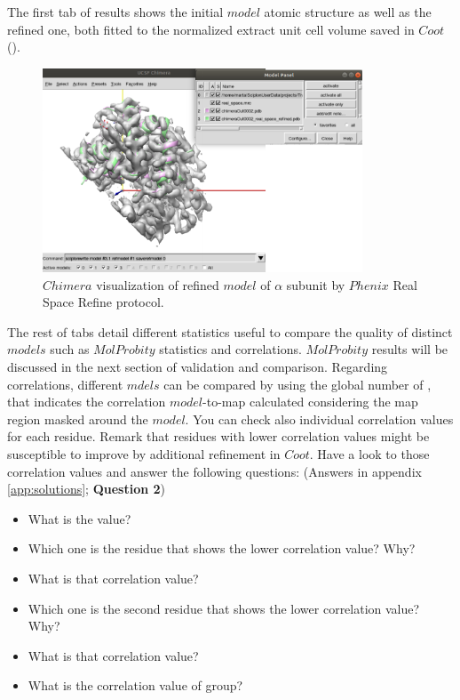 \begin{itemize}
 The first tab of results shows the initial $model$ atomic structure as well as the refined one, both fitted to the normalized extract unit cell volume saved in $Coot$ (). 
 
 \begin{figure}[H]
  \centering 
  \captionsetup{width=.7\linewidth} 
  \includegraphics[width=0.85\textwidth]{Images/Fig30}
  \caption{$Chimera$ visualization of refined $model$ of  $\alpha$ subunit by $Phenix$ Real Space Refine protocol.}
  \label{fig:phenix_real_space_refine_chimera}
  \end{figure}
  
  The rest of tabs detail different statistics useful to compare the quality of distinct $models$ such as $MolProbity$ statistics and  correlations. $MolProbity$ results will be discussed in the next section of validation and comparison. Regarding  correlations, different $mdels$ can be compared by using the global number of \ccmask, that indicates the correlation $model$-to-map calculated considering the map region masked around the $model$. You can check also individual correlation values for each residue.  Remark that residues with lower correlation values might be susceptible to improve by additional refinement in $Coot$. Have a look to those correlation values and answer the following questions: (Answers in appendix \ref{app:solutions}; \textbf{Question 2}) \\
  
  \begin{minipage}{\linewidth}
  \begin{framed}
  \begin{itemize}
  \item What is the \ccmask value?
  \item Which one is the residue that shows the lower correlation value? Why?
  \item What is that correlation value?
  \item Which one is the second residue that shows the lower correlation value? Why?
  \item What is that correlation value?
  \item What is the correlation value of  group?
  \end{itemize}
  \end{framed}
  \end{minipage}
  

\end{itemize}
